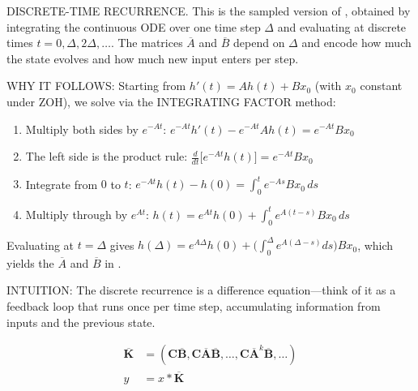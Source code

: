 \begin{ThomasAnnotation}
  DISCRETE-TIME RECURRENCE. This is the sampled version of , obtained by integrating the continuous ODE over one time step $\Delta$ and evaluating at discrete times $t = 0, \Delta, 2\Delta, \ldots$. The matrices $\overline{A}$ and $\overline{B}$ depend on $\Delta$ and encode how much the state evolves and how much new input enters per step.
  
  WHY IT FOLLOWS: Starting from $h'(t) = Ah(t) + Bx_0$ (with $x_0$ constant under ZOH), we solve via the INTEGRATING FACTOR method:
  \begin{enumerate}
    \item Multiply both sides by $e^{-At}$: \quad $e^{-At}h'(t) - e^{-At}Ah(t) = e^{-At}Bx_0$
    \item The left side is the product rule: \quad $\frac{d}{dt}\bigl[e^{-At}h(t)\bigr] = e^{-At}Bx_0$
    \item Integrate from $0$ to $t$: \quad $e^{-At}h(t) - h(0) = \int_0^t e^{-As}Bx_0\,ds$
    \item Multiply through by $e^{At}$: \quad $h(t) = e^{At}h(0) + \int_0^t e^{A(t-s)}Bx_0\,ds$
  \end{enumerate}
  Evaluating at $t = \Delta$ gives $h(\Delta) = e^{A\Delta}h(0) + \bigl(\int_0^\Delta e^{A(\Delta-s)}ds\bigr)Bx_0$, which yields the $\overline{A}$ and $\overline{B}$ in .
  
  INTUITION: The discrete recurrence is a difference equation---think of it as a feedback loop that runs once per time step, accumulating information from inputs and the previous state.
\end{ThomasAnnotation}

\begin{minipage}[t]{.39\linewidth}
  \begin{subequations}%
    \label{eq:ssm:convolution}
    \begin{align}
      \label{eq:ssm:convolution:1}
      \bm{\overline{K}} &= (\bm{C}\bm{\overline{B}}, \bm{C}\bm{\overline{A}}\bm{\overline{B}}, \dots, \bm{C}\bm{\overline{A}}^{k}\bm{\overline{B}}, \dots) \\
      \label{eq:ssm:convolution:2}
      y &= x \ast \bm{\overline{K}}
    \end{align}
  \end{subequations}
\end{minipage}

